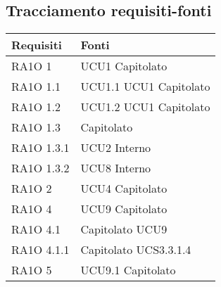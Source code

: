 \subsection{Tracciamento requisiti-fonti}
      \begin{center}
      \bgroup
      \def\arraystretch{1.8}
      \begin{longtable}{ | p{5cm} | p{5cm} |}
    
      \cellcolor[gray]{0.9} \textbf{Requisiti} & \cellcolor[gray]{0.9} \textbf{Fonti} \\ \hline       
        RA1O 1 &  UCU1 \newline  Capitolato \newline  \\ \hline      
        RA1O 1.1 &  UCU1.1 \newline  UCU1 \newline  Capitolato \newline  \\ \hline      
        RA1O 1.2 &  UCU1.2 \newline  UCU1 \newline  Capitolato \newline  \\ \hline      
        RA1O 1.3  &  Capitolato \newline  \\ \hline      
        RA1O 1.3.1 &  UCU2 \newline  Interno \newline  \\ \hline      
        RA1O 1.3.2 &  UCU8 \newline  Interno \newline  \\ \hline      
        RA1O 2  &  UCU4 \newline  Capitolato \newline  \\ \hline      
        RA1O 4 &  UCU9 \newline  Capitolato \newline  \\ \hline      
        RA1O 4.1  &  Capitolato \newline  UCU9 \newline  \\ \hline      
        RA1O 4.1.1  &  Capitolato \newline  UCS3.3.1.4 \newline  \\ \hline      
        RA1O 5  &  UCU9.1 \newline  Capitolato \newline  \\ \hline      

\end{longtable}
\end{center}
